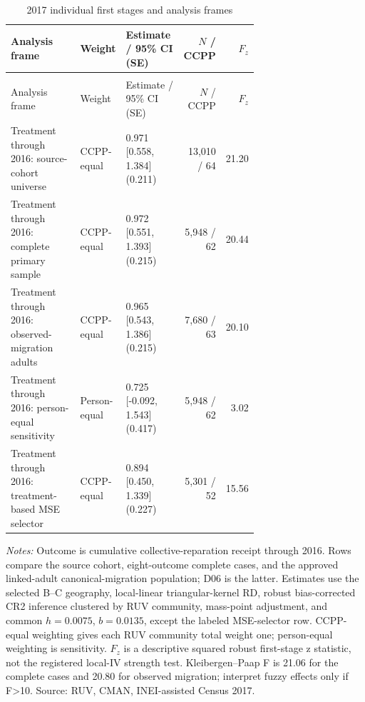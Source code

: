 \begingroup\fontsize{9.25}{11.4}\selectfont
\setlength{\tabcolsep}{3pt}\renewcommand{\arraystretch}{1.18}
\begin{longtable}{@{}>{\raggedright\arraybackslash}p{0.31\linewidth}p{0.14\linewidth}p{0.24\linewidth}rr@{}}
\caption{2017 individual first stages and analysis frames}\label{tab:pub_A22} \\
\toprule Analysis frame & Weight & Estimate / 95\% CI (SE) & \(N\) / CCPP & \(F_z\) \\ \midrule\endfirsthead
\multicolumn{5}{c}{\tablename\ \thetable{} -- continued} \\
\toprule Analysis frame & Weight & Estimate / 95\% CI (SE) & \(N\) / CCPP & \(F_z\) \\ \midrule\endhead
Treatment through 2016: source-cohort universe & CCPP-equal & \shortstack[r]{0.971 \\{} [0.558, 1.384] \\{} (0.211)} & 13,010 / 64 & 21.20 \\
Treatment through 2016: complete primary sample & CCPP-equal & \shortstack[r]{0.972 \\{} [0.551, 1.393] \\{} (0.215)} & 5,948 / 62 & 20.44 \\
Treatment through 2016: observed-migration adults & CCPP-equal & \shortstack[r]{0.965 \\{} [0.543, 1.386] \\{} (0.215)} & 7,680 / 63 & 20.10 \\
Treatment through 2016: person-equal sensitivity & Person-equal & \shortstack[r]{0.725 \\{} [-0.092, 1.543] \\{} (0.417)} & 5,948 / 62 & 3.02 \\
Treatment through 2016: treatment-based MSE selector & CCPP-equal & \shortstack[r]{0.894 \\{} [0.450, 1.339] \\{} (0.227)} & 5,301 / 52 & 15.56 \\
\bottomrule\end{longtable}
\parbox{0.97\linewidth}{\footnotesize \textit{Notes:} Outcome is cumulative collective-reparation receipt through 2016. Rows compare the source cohort, eight-outcome complete cases, and the approved linked-adult canonical-migration population; D06 is the latter. Estimates use the selected B--C geography, local-linear triangular-kernel RD, robust bias-corrected CR2 inference clustered by RUV community, mass-point adjustment, and common \(h=0.0075\), \(b=0.0135\), except the labeled MSE-selector row. CCPP-equal weighting gives each RUV community total weight one; person-equal weighting is sensitivity. \(F_z\) is a descriptive squared robust first-stage z statistic, not the registered local-IV strength test. Kleibergen--Paap F is 21.06 for the complete cases and 20.80 for observed migration; interpret fuzzy effects only if F>10. Source: RUV, CMAN, INEI-assisted Census 2017.}
